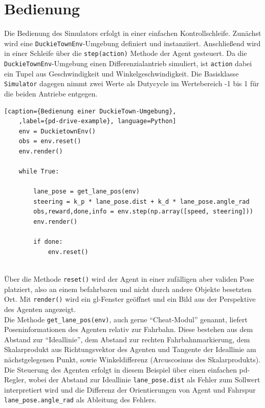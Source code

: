 \section{Bedienung}

Die Bedienung des Simulators erfolgt in einer einfachen Kontrollschleife. Zunächst wird eine \texttt{DuckieTownEnv}-Umgebung definiert und instanziiert. Anschließend wird in einer Schleife über die \texttt{step(action)} Methode der Agent gesteuert. Da die  \texttt{DuckieTownEnv}-Umgebung einen Differenzialantrieb simuliert, ist \texttt{action} dabei ein Tupel aus Geschwindigkeit und Winkelgeschwindigkeit. Die Basisklasse \texttt{Simulator} dagegen nimmt zwei Werte als Dutycycle im Wertebereich -1 bis 1 für die beiden Antriebe entgegen.

\begin{minipage}{\linewidth}
	\begin{lstlisting}[caption={Bedienung einer DuckieTown-Umgebung},
	,label={pd-drive-example}, language=Python]
	env = DuckietownEnv()
	obs = env.reset()
	env.render()
	
	while True:
		
		lane_pose = get_lane_pos(env)
		steering = k_p * lane_pose.dist + k_d * lane_pose.angle_rad
		obs,reward,done,info = env.step(np.array([speed, steering]))
		env.render()
		
		if done:
			env.reset()
	
	\end{lstlisting}
\end{minipage}

Über die Methode \texttt{reset()} wird der Agent in einer zufälligen aber validen Pose platziert, also an einem befahrbaren und nicht durch andere Objekte besetzten Ort. Mit \texttt{render()} wird ein \acs{gl}-Fenster geöffnet und ein Bild aus der Perspektive des Agenten angezeigt.\\

Die Methode \texttt{get\_lane\_pos(env)}, auch gerne ``Cheat-Modul'' genannt, liefert Poseninformationen des Agenten relativ zur Fahrbahn. Diese bestehen aus dem Abstand zur ``Ideallinie'', dem Abstand zur rechten Fahrbahnmarkierung, dem Skalarprodukt aus Richtungsvektor des Agenten und Tangente der Ideallinie am nächstgelegenen Punkt, sowie Winkeldifferenz (Arcuscosinus des Skalarprodukts).\\

Die Steuerung des Agenten erfolgt in diesem Beispiel über einen einfachen \acs{pd}-Regler, wobei der Abstand zur Ideallinie \texttt{lane\_pose.dist} als Fehler zum Sollwert interpretiert wird und die Differenz der Orientierungen von Agent und Fahrspur \texttt{lane\_pose.angle\_rad} als Ableitung des Fehlers.\\

